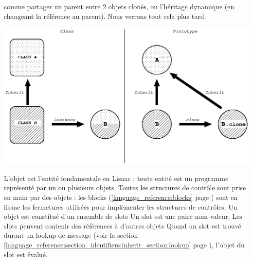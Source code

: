 \documentclass[11pt]{mybook}
\begin{document}
{comme partager un parent entre 2 objets clon\'es, ou l'h\'eritage dynamique (en changeant la r\'ef\'erence au parent). 
Nous verrons tout cela plus tard.
			\begin{center}
			\includegraphics[scale=0.9]{figures/class_vs_prototype2} 
			\end{center}
L'objet est l'entit\'e fondamentale en Lisaac : toute entit\'e est un programme repr\'esent\'e par un ou plusieurs objets.
Toutes les structures de contr\^ole sont prise en main par des objets : les blocks (\ref{language_reference:blocks} page \pageref{language_reference:blocks}) sont en lisaac les fermetures utilis\'ees pour impl\'ementer les structures de contr\^oles.
Un objet est constitu\'e d'un ensemble de slots
Un slot est une paire nom-valeur.
Les slots peuvent contenir des r\'ef\'erences \`a d'autres objets
Quand un slot est trouv\'e durant un lookup de message (voir la section \ref{language_reference:section_identifiers:inherit_section:lookup}
page \pageref{language_reference:section_identifiers:inherit_section:lookup}), l'objet du slot est \'evalu\'e.
}


\end{document}
